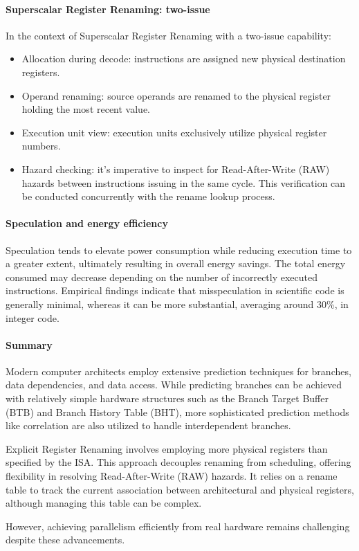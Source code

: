 \paragraph*{Superscalar Register Renaming: two-issue}
In the context of Superscalar Register Renaming with a two-issue capability:
\begin{itemize}
    \item Allocation during decode: instructions are assigned new physical destination registers.
    \item Operand renaming: source operands are renamed to the physical register holding the most recent value.
    \item Execution unit view: execution units exclusively utilize physical register numbers.
    \item Hazard checking: it's imperative to inspect for Read-After-Write (RAW) hazards between instructions issuing in the same cycle. 
        This verification can be conducted concurrently with the rename lookup process.
\end{itemize}

\paragraph*{Speculation and energy efficiency}
Speculation tends to elevate power consumption while reducing execution time to a greater extent, ultimately resulting in overall energy savings. 
The total energy consumed may decrease depending on the number of incorrectly executed instructions. 
Empirical findings indicate that misspeculation in scientific code is generally minimal, whereas it can be more substantial, averaging around 30\%, in integer code.

\paragraph*{Summary}
Modern computer architects employ extensive prediction techniques for branches, data dependencies, and data access. 
While predicting branches can be achieved with relatively simple hardware structures such as the Branch Target Buffer (BTB) and Branch History Table (BHT), more sophisticated prediction methods like correlation are also utilized to handle interdependent branches.

Explicit Register Renaming involves employing more physical registers than specified by the ISA. 
This approach decouples renaming from scheduling, offering flexibility in resolving Read-After-Write (RAW) hazards. 
It relies on a rename table to track the current association between architectural and physical registers, although managing this table can be complex.

However, achieving parallelism efficiently from real hardware remains challenging despite these advancements.